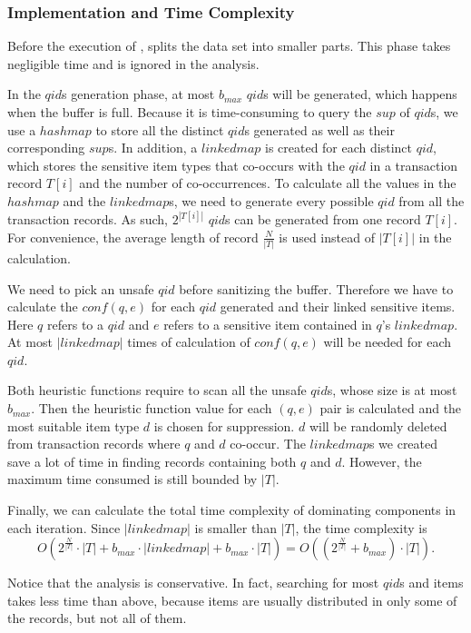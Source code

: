 \subsubsection{Implementation and Time Complexity}

Before the execution of \PartialSuppressor, \SplitData
splits the data set into smaller parts.
This phase takes negligible time and is ignored in the analysis.

In the $qid$s generation phase, at most $b_{max}$ $qid$s will be generated,
which happens when the buffer is full.
Because it is time-consuming to query the $sup$ of $qid$s,
we use a $hashmap$ to store all the distinct $qid$s generated as well as their corresponding $sup$s.
In addition, a $linkedmap$ is created for each distinct $qid$,
which stores the sensitive item types that co-occurs with the $qid$ in a transaction record $T[i]$
and the number of co-occurrences.
To calculate all the values in the $hashmap$ and the $linkedmap$s,
we need to generate every possible $qid$ from all the transaction records.
As such, $2^{|T[i]|}$ $qid$s can be generated from one record $T[i]$.
For convenience, the average length of record $\frac{N}{|T|}$ is used instead of $|T[i]|$ in the calculation.

We need to pick an unsafe $qid$ before sanitizing the buffer.
Therefore we have to calculate the $conf(q,e)$ for each $qid$ generated and their linked sensitive items.
Here $q$ refers to a $qid$ and $e$ refers to a sensitive item contained in $q$'s $linkedmap$.
At most $|linkedmap|$ times of calculation of $conf(q,e)$ will be needed for each $qid$.

Both heuristic functions require to scan all the unsafe $qid$s,
whose size is at most $b_{max}$. Then the heuristic function value for each
$(q, e)$ pair is calculated and the most suitable item type $d$
is chosen for suppression. $d$ will be randomly deleted from
transaction records where $q$ and $d$ co-occur.
The $linkedmap$s we created save a lot of time in finding
records containing both $q$ and $d$. However, the maximum time consumed
is still bounded by $|T|$.

Finally, we can calculate the total time complexity of dominating components in each iteration.
Since $|linkedmap|$ is smaller than $|T|$, the time complexity is
\begin{equation}\label{eq:complexity}
O(2^{\frac{N}{|T|}}\cdot |T|+b_{max}\cdot |linkedmap|+b_{max}\cdot |T|) = O((2^{\frac{N}{|T|}}+b_{max})\cdot |T|).
\end{equation}

Notice that the analysis is conservative.
In fact, searching for most $qid$s and items takes less time than above,
because items are usually distributed in only some of the records, but not all of them.
